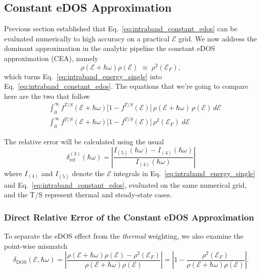 \subsection{Constant eDOS Approximation}
\label{sec:constant_edos_approximation}

Previous section established that Eq.~\eqref{eq:intraband_constant_edos} can be evaluated numerically to high accuracy on a practical $\mathcal{E}$ grid. We now address the dominant approximation in the analytic pipeline the constant eDOS approximation (CEA), namely
\begin{equation}
\rho(\mathcal{E}+\hbar\omega)\rho(\mathcal{E})\;\approx\;\rho^2(\mathcal{E}_F),
\label{eq:constant_edos_replacement}
\end{equation}
which turns Eq.~\eqref{eq:intraband_energy_single} into Eq.~\eqref{eq:intraband_constant_edos}. The equations that we're going to compare here are the two that follow
\begin{equation}
\boxed{\begin{aligned}
\;& \int_{0}^{\infty} f^{T / S}(\mathcal{E}+\hbar\omega)\big[1-f^{T/S}(\mathcal{E})\big]\,
\rho(\mathcal{E}+\hbar\omega)\, \rho(\mathcal{E})\, d\mathcal{E} \\
\; &\int_{0}^{\infty}
 f^{T/S}(\mathcal{E}+\hbar\omega)\big[1-f^{T/S}(\mathcal{E})\big] \,\rho^{2}(\mathcal{E}_{F}) \;  d\mathcal{E}
\end{aligned}}
\label{eq:constant_edos_comparison_pair}
\end{equation}

The relative error will be calculated using the usual
\begin{equation}
\delta_{\mathrm{rel}}^{(3)}(\hbar\omega)
=\left|\frac{I_{(5)}(\hbar\omega)-I_{(4)}(\hbar\omega)}{I_{(4)}(\hbar\omega)}\right|
\label{eq:constant_edos_relative_error}
\end{equation}
where $I_{(4)}$ and $I_{(5)}$ denote the $\mathcal{E}$ integrals in Eq.~\eqref{eq:intraband_energy_single} and Eq.~\eqref{eq:intraband_constant_edos}, evaluated on the same numerical grid, and the T/S represent thermal and steady-state cases.

\subsubsection{Direct Relative Error of the Constant eDOS Approximation}
To separate the eDOS effect from the \emph{thermal} weighting, we also examine the point-wise mismatch
\begin{equation}
\delta_{\text{DOS}}(\mathcal{E},\hbar\omega)
=\left|\frac{\rho(\mathcal{E}+\hbar\omega)\rho(\mathcal{E})-\rho^{2}(\mathcal{E}_{F})}{\rho(\mathcal{E}+\hbar\omega)\rho(\mathcal{E})}\right|
=\left|1-\frac{\rho^{2}(\mathcal{E}_F)}{\rho(\mathcal{E}+\hbar\omega)\rho(\mathcal{E})}\right|.
\label{eq:constant_edos_pointwise}
\end{equation}

